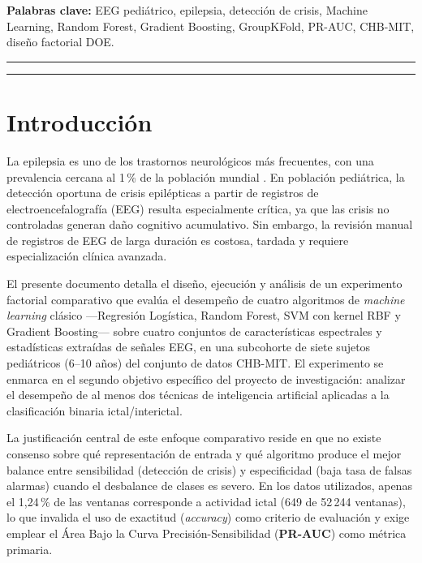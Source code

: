 \documentclass[12pt,a4paper]{article}
\begin{document}
\vspace{0.3cm}
\noindent\textbf{Palabras clave:} EEG pediátrico, epilepsia, detección de crisis,
Machine Learning, Random Forest, Gradient Boosting, GroupKFold, PR-AUC, CHB-MIT,
diseño factorial DOE.

\vspace{0.4cm}
\hrule
\vspace{0.3cm}

\tableofcontents

\vspace{0.4cm}
\hrule
\vspace{0.4cm}

\section{Introducción}

La epilepsia es uno de los trastornos neurológicos más frecuentes, con una prevalencia
cercana al 1\,\% de la población mundial \cite{who2019}. En población pediátrica, la
detección oportuna de crisis epilépticas a partir de registros de electroencefalografía
(EEG) resulta especialmente crítica, ya que las crisis no controladas generan daño
cognitivo acumulativo. Sin embargo, la revisión manual de registros de EEG de larga
duración es costosa, tardada y requiere especialización clínica avanzada.

El presente documento detalla el diseño, ejecución y análisis de un experimento factorial
comparativo que evalúa el desempeño de cuatro algoritmos de \textit{machine learning}
clásico —Regresión Logística, Random Forest, SVM con kernel RBF y Gradient Boosting—
sobre cuatro conjuntos de características espectrales y estadísticas extraídas de señales
EEG, en una subcohorte de siete sujetos pediátricos (6--10 años) del conjunto de datos
CHB-MIT. El experimento se enmarca en el segundo objetivo específico del proyecto de
investigación: analizar el desempeño de al menos dos técnicas de inteligencia artificial
aplicadas a la clasificación binaria ictal/interictal.

La justificación central de este enfoque comparativo reside en que no existe consenso
sobre qué representación de entrada y qué algoritmo produce el mejor balance entre
sensibilidad (detección de crisis) y especificidad (baja tasa de falsas alarmas) cuando el
desbalance de clases es severo. En los datos utilizados, apenas el 1,24\,\% de las
ventanas corresponde a actividad ictal (649 de 52\,244 ventanas), lo que invalida el uso
de exactitud (\textit{accuracy}) como criterio de evaluación y exige emplear el Área Bajo
la Curva Precisión-Sensibilidad (\textbf{PR-AUC}) como métrica primaria.
\end{document}
